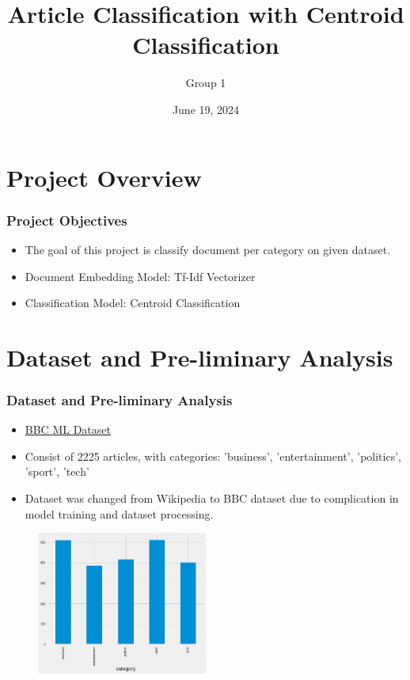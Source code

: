 \documentclass[
  10pt %
  16:9, %
]{beamer}
\title{Article Classification with Centroid Classification}
\subtitle{}
\author{Group 1}
\date[June 19, 2024]
 {June 19, 2024}
\begin{document}
\frame{\titlepage} %
\section[Outline]{}
\frame{\tableofcontents}

\section{Project Overview}
 
\frame %
{
  \frametitle{Project Objectives}
  \begin{itemize}
  \item The goal of this project is classify document per category on given dataset.
  \item Document Embedding Model: Tf-Idf Vectorizer
  \item Classification Model: Centroid Classification
  \end{itemize}
}

\section{Dataset and Pre-liminary Analysis}
\frame
{
  \frametitle{Dataset and Pre-liminary Analysis}
  \begin{itemize}
  \item \href{http://mlg.ucd.ie/datasets/bbc.html}{BBC ML Dataset}
  \item Consist of 2225 articles, with categories: 'business', 'entertainment', 'politics', 'sport', 'tech'
  \item Dataset was changed from Wikipedia to BBC dataset due to complication in model training and dataset processing.
  \end{itemize}
  \begin{figure}
  \centering
  \includegraphics[width=0.5\textwidth]{categories.png}
  \end{figure}
}
\end{document}
